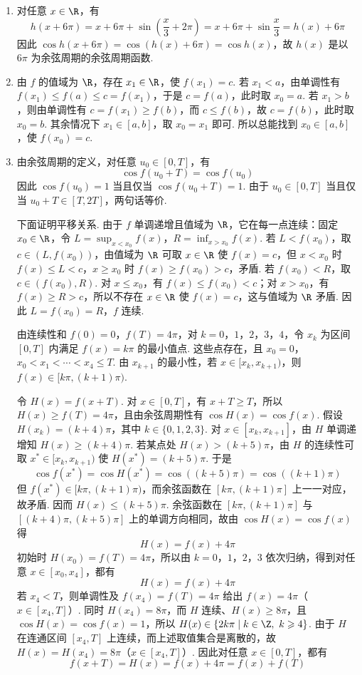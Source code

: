 \begin{solution}
\begin{enumerate}
\item 对任意 \(x\in\R\)，有
\[
h(x+6\pi)=x+6\pi+\sin\left(\frac x3+2\pi\right)=x+6\pi+\sin\frac x3=h(x)+6\pi
\]
因此 \(\cos h(x+6\pi)=\cos(h(x)+6\pi)=\cos h(x)\)，故 \(h(x)\) 是以 \(6\pi\) 为余弦周期的余弦周期函数.

\item 由 \(f\) 的值域为 \(\R\)，存在 \(x_1\in\R\)，使 \(f(x_1)=c\). 若 \(x_1<a\)，由单调性有 \(f(x_1)\leqslant f(a)\leqslant c=f(x_1)\)，于是 \(c=f(a)\)，此时取 \(x_0=a\). 若 \(x_1>b\)，则由单调性有 \(c=f(x_1)\geqslant f(b)\)，而 \(c\leqslant f(b)\)，故 \(c=f(b)\)，此时取 \(x_0=b\). 其余情况下 \(x_1\in[a,b]\)，取 \(x_0=x_1\) 即可. 所以总能找到 \(x_0\in[a,b]\)，使 \(f(x_0)=c\).

\item 由余弦周期的定义，对任意 \(u_0\in[0,T]\)，有
\[
\cos f(u_0+T)=\cos f(u_0)
\]
因此 \(\cos f(u_0)=1\) 当且仅当 \(\cos f(u_0+T)=1\). 由于 \(u_0\in[0,T]\) 当且仅当 \(u_0+T\in[T,2T]\)，两句话等价.

下面证明平移关系. 由于 \(f\) 单调递增且值域为 \(\R\)，它在每一点连续：固定 \(x_0\in\R\)，令 \(L=\sup_{x<x_0}f(x)\)，\(R=\inf_{x>x_0}f(x)\). 若 \(L<f(x_0)\)，取 \(c\in(L,f(x_0))\)，由值域为 \(\R\) 可取 \(x\in\R\) 使 \(f(x)=c\)，但 \(x<x_0\) 时 \(f(x)\leqslant L<c\)，\(x\geqslant x_0\) 时 \(f(x)\geqslant f(x_0)>c\)，矛盾. 若 \(f(x_0)<R\)，取 \(c\in(f(x_0),R)\). 对 \(x\leqslant x_0\)，有 \(f(x)\leqslant f(x_0)<c\)；对 \(x>x_0\)，有 \(f(x)\geqslant R>c\)，所以不存在 \(x\in\R\) 使 \(f(x)=c\)，这与值域为 \(\R\) 矛盾. 因此 \(L=f(x_0)=R\)，\(f\) 连续.

由连续性和 \(f(0)=0\)，\(f(T)=4\pi\)，对 \(k=0\)，\(1\)，\(2\)，\(3\)，\(4\)，令 \(x_k\) 为区间 \([0,T]\) 内满足 \(f(x)=k\pi\) 的最小值点. 这些点存在，且 \(x_0=0\)，\(x_0<x_1<\cdots<x_4\leqslant T\). 由 \(x_{k+1}\) 的最小性，若 \(x\in[x_k,x_{k+1})\)，则 \(f(x)\in[k\pi,(k+1)\pi)\).

令 \(H(x)=f(x+T)\). 对 \(x\in[0,T]\)，有 \(x+T\geqslant T\)，所以 \(H(x)\geqslant f(T)=4\pi\)，且由余弦周期性有 \(\cos H(x)=\cos f(x)\). 假设 \(H(x_k)=(k+4)\pi\)，其中 \(k\in\{0,1,2,3\}\). 对 \(x\in[x_k,x_{k+1}]\)，由 \(H\) 单调递增知 \(H(x)\geqslant(k+4)\pi\). 若某点处 \(H(x)>(k+5)\pi\)，由 \(H\) 的连续性可取 \(x^\ast\in[x_k,x_{k+1})\) 使 \(H(x^\ast)=(k+5)\pi\). 于是
\[
\cos f(x^\ast)=\cos H(x^\ast)=\cos((k+5)\pi)=\cos((k+1)\pi)
\]
但 \(f(x^\ast)\in[k\pi,(k+1)\pi)\)，而余弦函数在 \([k\pi,(k+1)\pi]\) 上一一对应，故矛盾. 因而 \(H(x)\leqslant(k+5)\pi\). 余弦函数在 \([k\pi,(k+1)\pi]\) 与 \([(k+4)\pi,(k+5)\pi]\) 上的单调方向相同，故由 \(\cos H(x)=\cos f(x)\) 得
\[
H(x)=f(x)+4\pi
\]
初始时 \(H(x_0)=f(T)=4\pi\)，所以由 \(k=0\)，\(1\)，\(2\)，\(3\) 依次归纳，得到对任意 \(x\in[x_0,x_4]\)，都有
\[
H(x)=f(x)+4\pi
\]
若 \(x_4<T\)，则单调性及 \(f(x_4)=f(T)=4\pi\) 给出 \(f(x)=4\pi\)（\(x\in[x_4,T]\)）. 同时 \(H(x_4)=8\pi\)，而 \(H\) 连续、\(H(x)\geqslant8\pi\)，且 \(\cos H(x)=\cos f(x)=1\)，所以 \(H(x)\in\{2k\pi\mid k\in\Z,\ k\geqslant4\}\). 由于 \(H\) 在连通区间 \([x_4,T]\) 上连续，而上述取值集合是离散的，故 \(H(x)=H(x_4)=8\pi\)（\(x\in[x_4,T]\)）. 因此对任意 \(x\in[0,T]\)，都有
\[
f(x+T)=H(x)=f(x)+4\pi=f(x)+f(T)
\]
\end{enumerate}
\end{solution}
